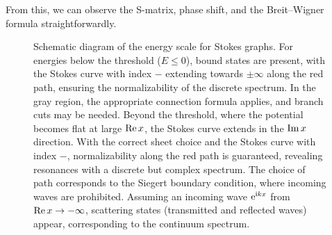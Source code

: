From this, we can observe the S-matrix, phase shift, and the Breit--Wigner formula straightforwardly.
\begin{figure}[t]
\centering
{}
  \caption{Schematic diagram of the energy scale for Stokes graphs. For energies below the threshold ($E \leq 0$), bound states are present, with the Stokes curve with index $-$ extending towards $\pm \infty$ along the red path, ensuring the normalizability of the discrete spectrum. In the gray region, the appropriate connection formula applies, and branch cuts may be needed. Beyond the threshold, where the potential becomes flat at large $\operatorname{Re} x$, the Stokes curve extends in the $\operatorname{Im} x$ direction. With the correct sheet choice and the Stokes curve with index $-$, normalizability along the red path is guaranteed, revealing resonances with a discrete but complex spectrum. The choice of path corresponds to the Siegert boundary condition, where incoming waves are prohibited. Assuming an incoming wave $\mathrm{e}^{\mathrm{i} kx}$ from $\operatorname{Re} x \to -\infty$, scattering states (transmitted and reflected waves) appear, corresponding to the continuum spectrum.}
  \label{src:2508_09211:fig:stokes_dist}
\end{figure}
